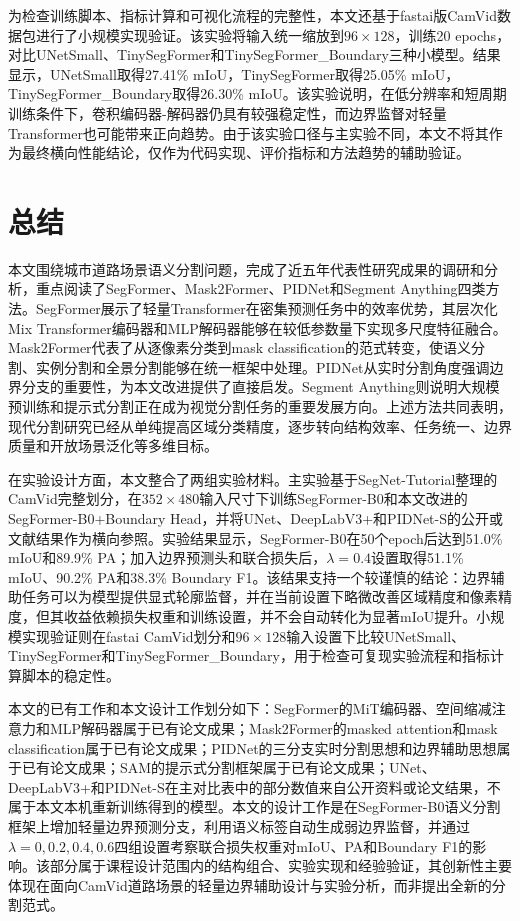 \documentclass{report}
\begin{document}
为检查训练脚本、指标计算和可视化流程的完整性，本文还基于fastai版CamVid数据包进行了小规模实现验证。该实验将输入统一缩放到$96 \times 128$，训练20 epochs，对比UNetSmall、TinySegFormer和TinySegFormer\_Boundary三种小模型。结果显示，UNetSmall取得27.41\% mIoU，TinySegFormer取得25.05\% mIoU，TinySegFormer\_Boundary取得26.30\% mIoU。该实验说明，在低分辨率和短周期训练条件下，卷积编码器-解码器仍具有较强稳定性，而边界监督对轻量Transformer也可能带来正向趋势。由于该实验口径与主实验不同，本文不将其作为最终横向性能结论，仅作为代码实现、评价指标和方法趋势的辅助验证。
\section{总结}

本文围绕城市道路场景语义分割问题，完成了近五年代表性研究成果的调研和分析，重点阅读了SegFormer、Mask2Former、PIDNet和Segment Anything四类方法。SegFormer展示了轻量Transformer在密集预测任务中的效率优势，其层次化Mix Transformer编码器和MLP解码器能够在较低参数量下实现多尺度特征融合。Mask2Former代表了从逐像素分类到mask classification的范式转变，使语义分割、实例分割和全景分割能够在统一框架中处理。PIDNet从实时分割角度强调边界分支的重要性，为本文改进提供了直接启发。Segment Anything则说明大规模预训练和提示式分割正在成为视觉分割任务的重要发展方向。上述方法共同表明，现代分割研究已经从单纯提高区域分类精度，逐步转向结构效率、任务统一、边界质量和开放场景泛化等多维目标。

在实验设计方面，本文整合了两组实验材料。主实验基于SegNet-Tutorial整理的CamVid完整划分，在$352 \times 480$输入尺寸下训练SegFormer-B0和本文改进的SegFormer-B0+Boundary Head，并将UNet、DeepLabV3+和PIDNet-S的公开或文献结果作为横向参照。实验结果显示，SegFormer-B0在50个epoch后达到51.0\% mIoU和89.9\% PA；加入边界预测头和联合损失后，$\lambda=0.4$设置取得51.1\% mIoU、90.2\% PA和38.3\% Boundary F1。该结果支持一个较谨慎的结论：边界辅助任务可以为模型提供显式轮廓监督，并在当前设置下略微改善区域精度和像素精度，但其收益依赖损失权重和训练设置，并不会自动转化为显著mIoU提升。小规模实现验证则在fastai CamVid划分和$96 \times 128$输入设置下比较UNetSmall、TinySegFormer和TinySegFormer\_Boundary，用于检查可复现实验流程和指标计算脚本的稳定性。

本文的已有工作和本文设计工作划分如下：SegFormer的MiT编码器、空间缩减注意力和MLP解码器属于已有论文成果；Mask2Former的masked attention和mask classification属于已有论文成果；PIDNet的三分支实时分割思想和边界辅助思想属于已有论文成果；SAM的提示式分割框架属于已有论文成果；UNet、DeepLabV3+和PIDNet-S在主对比表中的部分数值来自公开资料或论文结果，不属于本文本机重新训练得到的模型。本文的设计工作是在SegFormer-B0语义分割框架上增加轻量边界预测分支，利用语义标签自动生成弱边界监督，并通过$\lambda=0,0.2,0.4,0.6$四组设置考察联合损失权重对mIoU、PA和Boundary F1的影响。该部分属于课程设计范围内的结构组合、实验实现和经验验证，其创新性主要体现在面向CamVid道路场景的轻量边界辅助设计与实验分析，而非提出全新的分割范式。
\end{document}
